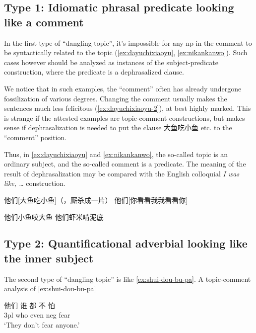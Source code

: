 \documentclass[UTF8, a4paper, oneside, scheme=plain, 12pt]{ctexrep}
\newcommand{\form}[1]{\emph{#1}}
\newcommand{\translate}[1]{`#1'}
\begin{document}
\subsection{Type 1: Idiomatic phrasal predicate looking like a comment}\label{sec:clause.dangling-topic.1}

In the first type of ``dangling topic'',
it's impossible for any \acs{np} in the comment to be syntactically related to the topic
(\ref{ex:dayuchixiaoyu}, \ref{ex:nikankanwo}).
Such cases however should be analyzed as instances of the
subject-predicate construction,
where the predicate is a dephrasalized clause.

We notice that in such examples, 
the ``comment'' often has already undergone fossilization of various degrees.
Changing the comment usually makes the sentences much less felicitous 
(\ref{ex:dayuchixiaoyu-2}),
at best highly marked.
This is strange if the attested examples are topic-comment constructions,
but makes sense if dephrasalization is needed 
to put the clause 大鱼吃小鱼 etc. to the ``comment'' position.

Thus, in \eqref{ex:dayuchixiaoyu} and \eqref{ex:nikankanwo},
the so-called topic is an ordinary subject,
and the so-called comment is a predicate.
The meaning of the result of dephrasalization 
may be compared with the English colloquial 
\form{I was like, \dots} construction.

\begin{exe}
    \ex\label{ex:dayuchixiaoyu} 他们[大鱼吃小鱼]（，厮杀成一片）
    \ex\label{ex:nikankanwo} 他们[你看看我我看看你]
    
    \ex\label{ex:dayuchixiaoyu-2} \begin{xlist}
        \ex *他们小鱼咬大鱼 
        \ex *他们虾米啃泥底
    \end{xlist}
\end{exe}

\subsection{Type 2: Quantificational adverbial looking like the inner subject}

The second type of ``dangling topic'' is like \eqref{ex:shui-dou-bu-pa}.
A topic-comment analysis of \eqref{ex:shui-dou-bu-pa} 

\begin{exe}
    \ex\label{ex:shui-dou-bu-pa} \gll 他们 谁 都 不 怕 \\
    3pl who even \acs{neg} fear \\
    \glt \translate{They don't fear anyone.}
\end{exe}
\end{document}

